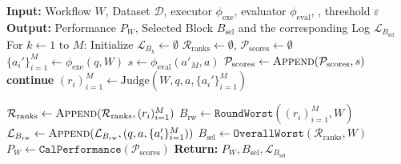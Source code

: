 \documentclass{article}
\theoremstyle{plain}
\theoremstyle{definition}
\theoremstyle{remark}
\begin{document}
\begin{algorithm}[t]
\caption{Evaluation-Judge}\label{alg:eval_judge}

\begin{algorithmic}[1]
    \STATE \textbf{Input:} Workflow $W$, Dataset $\mathcal{D}$, executor $\phi_{\text{exe}}$, evaluator $\phi_{\text{eval}}$, , threshold $\varepsilon$
    \STATE \textbf{Output:} Performance $P_W$, Selected Block $B_{\text{sel}}$ and the corresponding Log $\mathcal{L}_{B_{\text{sel}}}$
    \STATE For $k \leftarrow 1 \text{ to } M$: Initialize $\mathcal{L}_{B_k} \leftarrow \emptyset$ 
    \STATE $\mathcal{R}_{\text{ranks}} \leftarrow \emptyset$, $\mathcal{P}_{\text{scores}} \leftarrow \emptyset$
        \STATE $\{a_i'\}_{i=1}^M \leftarrow \phi_{\text{exe}}(q, W)$
        \STATE  $s\leftarrow \phi_{\text{eval}}(a'_M, a)$ 
        \STATE $\mathcal{P}_{\text{scores}} \gets \textsc{Append}(\mathcal{P}_{\text{scores}}, s)$
            \STATE \textbf{continue} 
        \ELSE
            \STATE $(r_i)_{i=1}^M \leftarrow \text{Judge}(W, q, a, \{a_i'\}_{i=1}^M)$ 
            
            \STATE $\mathcal{R}_{\text{ranks}} \gets \textsc{Append}(\mathcal{R}_{\text{ranks}}, (r_i)_{i=1}^M)$ 
            \STATE $B_{\text{rw}} \leftarrow \texttt{RoundWorst}((r_i)_{i=1}^M, W)$ 
            \STATE $\mathcal{L}_{B_{\text{rw}}} \gets \textsc{Append}(\mathcal{L}_{B_{\text{rw}}}, (q, a, \{a_i'\}_{i=1}^M))$ 
        \ENDIF
    \ENDFOR
    \STATE $B_{\text{sel}} \leftarrow \texttt{OverallWorst}(\mathcal{R}_{\text{ranks}}, W)$ 
    \STATE $P_W \leftarrow \texttt{CalPerformance}(\mathcal{P}_{\text{scores}})$ 
    \STATE \textbf{Return:} $P_W, B_{\text{sel}}, \mathcal{L}_{B_{\text{sel}}}$
\end{algorithmic}
\end{algorithm}
\end{document}

